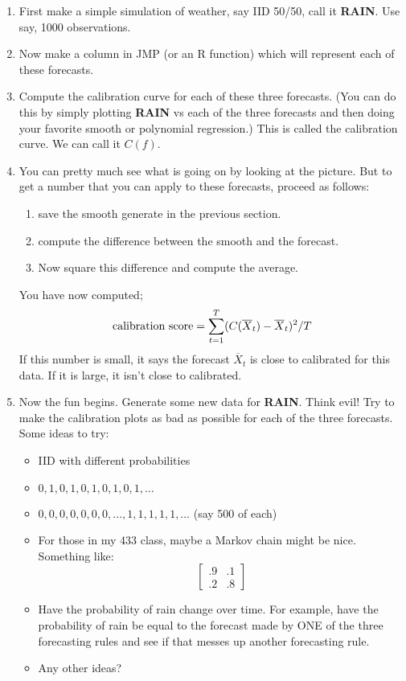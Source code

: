 \documentclass[12pt]{extarticle}
\begin{document}
\begin{enumerate}
\item First make a simple simulation of weather, say IID 50/50, call
it {\bf RAIN}.  Use say, 1000 observations.
\item Now make a column in JMP (or an R function) which will represent
each of these forecasts.
\item Compute the calibration curve for each of these three forecasts.
  (You can do this by simply plotting {\bf RAIN} vs each of the three
 forecasts and then doing your favorite smooth or polynomial
 regression.)  This is called the calibration curve.  We can call it
 $C(f)$.
\item You can pretty much see what is going on by looking at the
picture.  But to get a number that you can apply to these forecasts,
proceed as follows:
\begin{enumerate}
\item save the smooth generate in the previous section.
\item compute the difference between the smooth and the forecast.
\item Now square this difference and compute the average.
\end{enumerate}
You have now computed;
\begin{displaymath}
\hbox{calibration score} = \sum_{t=1}^T (C(\overline{X}_t) - \overline{X}_t)^2/T
\end{displaymath}
If this number is small, it says the forecast $\overline{X}_t$ is
close to calibrated for this data.  If it is large, it isn't close to
calibrated. 
\item Now the fun begins.  Generate some new data for {\bf RAIN}.
Think evil!  Try to make the calibration plots as bad as possible for
each of the three forecasts.  Some ideas to try:
\begin{itemize}
\item IID with different probabilities
\item $0,1,0,1,0,1,0,1,0,1,\ldots$
\item $0,0,0,0,0,0,0,\ldots,1,1,1,1,1,\ldots$ (say 500 of each)
\item For those in my 433 class, maybe a Markov chain might be
nice. Something like:
\begin{displaymath}
\left[\begin{array}{cc}.9 &.1\\.2 & .8
\end{array}
\right]
\end{displaymath}
\item Have the probability of rain change over time.  For example,
have the probability of rain be equal to the forecast made by ONE of
the three forecasting rules and see if that messes up another
forecasting rule.
\item Any other ideas?
\end{itemize}
\end{enumerate}
\end{document}
